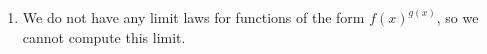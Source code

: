 \documentclass{ximera}
\begin{document}
\begin{question}
\begin{feedback}
\begin{enumerate}
   
   \item We do not have any limit laws for functions of the form $f(x)^{g(x)}$, so we cannot compute this limit.
    \end{enumerate}
    \end{feedback} 
    
\end{question}
\end{document}
